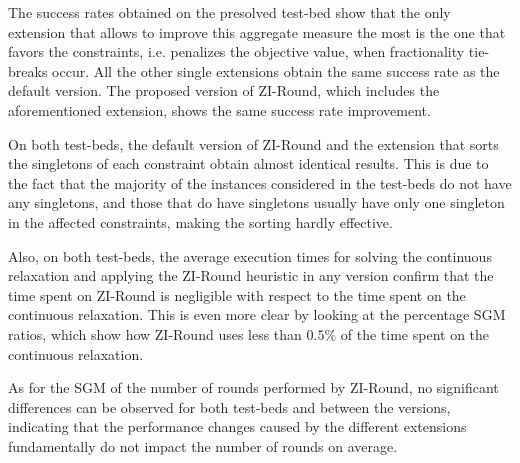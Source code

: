 \documentclass[a4paper,12pt,twoside]{scrbook}
\begin{document}
The success rates obtained on the presolved test-bed show that the only extension that allows to improve this aggregate measure the most is the one that favors the constraints, i.e. penalizes the objective value, when fractionality tie-breaks occur. All the other single extensions obtain the same success rate as the default version.
The proposed version of ZI-Round, which includes the aforementioned extension, shows the same success rate improvement. \par

On both test-beds, the default version of ZI-Round and the extension that sorts the singletons of each constraint obtain almost identical results. This is due to the fact that the majority of the instances considered in the test-beds do not have any singletons, and those that do have singletons usually have only one singleton in the affected constraints, making the sorting hardly effective. \par 

Also, on both test-beds, the average execution times for solving the continuous relaxation and applying the ZI-Round heuristic in any version confirm that the time spent on ZI-Round is negligible with respect to the time spent on the continuous relaxation. This is even more clear by looking at the percentage SGM ratios, which show how ZI-Round uses less than $0.5\%$ of the time spent on the continuous relaxation. \par

As for the SGM of the number of rounds performed by ZI-Round, no significant differences can be observed for both test-beds and between the versions, indicating that the performance changes caused by the different extensions fundamentally do not impact the number of rounds on average. 
\end{document}
